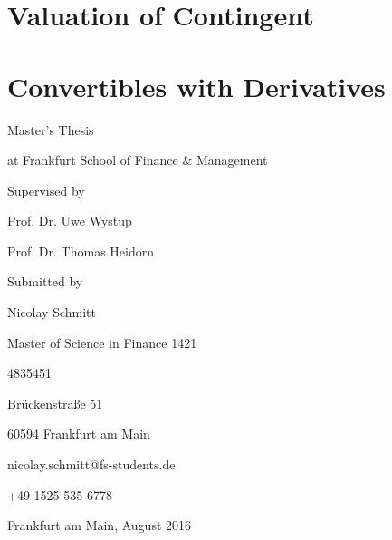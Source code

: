 \centerline{}
\centerline{}
\section*{\hfil Valuation of Contingent \hfil}
\section*{\hfil Convertibles with Derivatives \hfil}
\vfill
\vfill
\centerline{Master's Thesis}
\centerline{at Frankfurt School of Finance \& Management}
\vfill
\vfill
\centerline{Supervised by}
\centerline{Prof. Dr. Uwe Wystup}
\centerline{Prof. Dr. Thomas Heidorn}
\vfill
\vfill
\centerline{Submitted by }
\centerline{Nicolay Schmitt}
\centerline{Master of Science in Finance 1421}
\centerline{4835451}
\centerline{Br\"uckenstra\ss{}e 51}
\centerline{60594 Frankfurt am Main}
\centerline{\Letter \phantom{a}nicolay.schmitt@fs-students.de}
\centerline{\Telefon \phantom{a}+49 1525 535 6778}
\centerline{Frankfurt am Main, August 2016}
\centerline{}
\centerline{}
